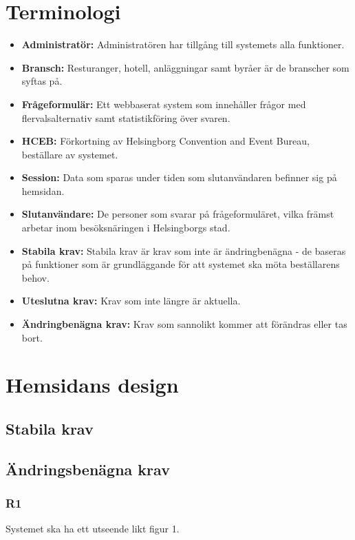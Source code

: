 \documentclass{article}
\begin{document}
    \section{Terminologi}
    \begin{itemize}
        \item \textbf{Administratör:} Administratören har tillgång till systemets alla funktioner.
        \item \textbf{Bransch:} Resturanger, hotell, anläggningar samt byråer är de branscher som syftas på.
         \item \textbf{Frågeformulär:} Ett webbaserat system som innehåller frågor med flervalsalternativ samt statistikföring över svaren.
        \item \textbf{HCEB:} Förkortning av Helsingborg Convention and Event Bureau, beställare av systemet.
        \item \textbf{Session:} Data som sparas under tiden som slutanvändaren befinner sig på hemsidan.
        \item \textbf{Slutanvändare:}  De personer som svarar på frågeformuläret, vilka främst arbetar inom besöksnäringen i Helsingborgs stad. 
        \item\textbf{Stabila krav:}  Stabila krav är krav som inte är ändringbenägna - de baseras på funktioner som är grundläggande för att systemet ska möta beställarens behov.
         \item \textbf{Uteslutna krav:}  Krav som inte längre är aktuella.
        \item \textbf{Ändringbenägna krav:}  Krav som sannolikt kommer att förändras eller tas bort.
       
    \end{itemize}
    \newpage
    \section{Hemsidans design}
    
    \subsection*{Stabila krav}
     
    \subsection*{Ändringsbenägna krav}
     \subsubsection*{R1}
    Systemet ska ha ett utseende likt figur 1.
    
\end{document}
